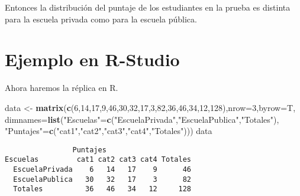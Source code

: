 \documentclass[
  a4paper,
  oneside,
  openany]{book}
\newenvironment{Shaded}{\begin{snugshade}}{\end{snugshade}}
\newcommand{\DataTypeTok}[1]{\textcolor[rgb]{0.13,0.29,0.53}{#1}}
\newcommand{\DecValTok}[1]{\textcolor[rgb]{0.00,0.00,0.81}{#1}}
\newcommand{\KeywordTok}[1]{\textcolor[rgb]{0.13,0.29,0.53}{\textbf{#1}}}
\newcommand{\NormalTok}[1]{#1}
\newcommand{\StringTok}[1]{\textcolor[rgb]{0.31,0.60,0.02}{#1}}
\begin{document}
Entonces la distribución del puntaje de los estudiantes en la prueba es distinta para la escuela privada como para la escuela pública.

\hypertarget{ejemplo-en-r-studio-11}{%
\section{Ejemplo en R-Studio}\label{ejemplo-en-r-studio-11}}

Ahora haremos la réplica en R.

\begin{Shaded}
\begin{Highlighting}[]
\NormalTok{data \textless{}{-}}\StringTok{ }\KeywordTok{matrix}\NormalTok{(}\KeywordTok{c}\NormalTok{(}\DecValTok{6}\NormalTok{,}\DecValTok{14}\NormalTok{,}\DecValTok{17}\NormalTok{,}\DecValTok{9}\NormalTok{,}\DecValTok{46}\NormalTok{,}\DecValTok{30}\NormalTok{,}\DecValTok{32}\NormalTok{,}\DecValTok{17}\NormalTok{,}\DecValTok{3}\NormalTok{,}\DecValTok{82}\NormalTok{,}\DecValTok{36}\NormalTok{,}\DecValTok{46}\NormalTok{,}\DecValTok{34}\NormalTok{,}\DecValTok{12}\NormalTok{,}\DecValTok{128}\NormalTok{),}\DataTypeTok{nrow=}\DecValTok{3}\NormalTok{,}\DataTypeTok{byrow=}\NormalTok{T, }
               \DataTypeTok{dimnames=}\KeywordTok{list}\NormalTok{(}\StringTok{"Escuelas"}\NormalTok{=}\KeywordTok{c}\NormalTok{(}\StringTok{"EscuelaPrivada"}\NormalTok{,}\StringTok{"EscuelaPublica"}\NormalTok{,}\StringTok{"Totales"}\NormalTok{), }
                             \StringTok{"Puntajes"}\NormalTok{=}\KeywordTok{c}\NormalTok{(}\StringTok{"cat1"}\NormalTok{,}\StringTok{"cat2"}\NormalTok{,}\StringTok{"cat3"}\NormalTok{,}\StringTok{"cat4"}\NormalTok{,}\StringTok{"Totales"}\NormalTok{)))}
\NormalTok{data}
\end{Highlighting}
\end{Shaded}

\begin{verbatim}
                Puntajes
Escuelas         cat1 cat2 cat3 cat4 Totales
  EscuelaPrivada    6   14   17    9      46
  EscuelaPublica   30   32   17    3      82
  Totales          36   46   34   12     128
\end{verbatim}
\end{document}
